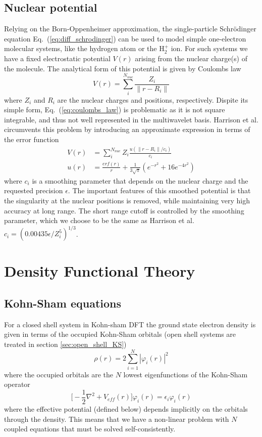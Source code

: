 \subsection{Nuclear potential}
Relying on the Born-Oppenheimer approximation, the single-particle 
Schr\"{o}dinger equation Eq.~(\ref{eq:diff_schrodinger}) can be used to model 
simple one-electron molecular systems, like the hydrogen atom or the H$_2^+$ 
ion. For such systems we have a fixed electrostatic potential $V(r)$ arising 
from the nuclear charge(s) of the molecule. The analytical form of this 
potential is given by Coulombs law
\begin{equation}
    \label{eq:coulombs_law}
    V(r) = \sum_i^{N_{nuc}} \frac{Z_i}{\| r-R_i \|}
\end{equation}
where $Z_i$ and $R_i$ are the nuclear charges and positions, respectively. 
Dispite its simple form, Eq.~(\ref{eq:coulombs_law}) is problematic as it is 
not square integrable, and thus not well represented in the multiwavelet basis. 
Harrison et al. \cite{Harrison} circumvents this problem by introducing an 
approximate expression in terms of the error function
\begin{align}
    \label{eq:harrison_potential}
    V(r) &= \sum_i^{N_{nuc}} Z_i \frac{u(\| r-R_i \|/c_i)}{c_i}\\
    u(r) &= \frac{erf(r)}{r} + \frac{1}{3\sqrt{\pi}}(e^{-r^2} + 16e^{-4r^2})
\end{align}
where $c_i$ is a smoothing parameter that depends on the nuclear charge and 
the requested precision $\epsilon$. The important features of this smoothed 
potential is that the singularity at the nuclear positions is removed, 
while maintaining very high accuracy at long range. The short range cutoff 
is controlled by the smoothing parameter, which we choose to be the same as 
Harrison et al.\cite{Harrison} $c_i = (0.00435 \epsilon/Z_i^5)^{1/3}$.

\section{Density Functional Theory} \label{sec:DFT}
\subsection{Kohn-Sham equations}
For a closed shell system in Kohn-sham DFT the ground state electron density is given 
in terms of the occupied Kohn-Sham orbitals (open shell systems are 
treated in section \ref{sec:open_shell_KS})
\begin{equation}
    \rho(r) = 2 \sum_{i=1}^N |\varphi_i(r)|^2
\end{equation}
where the occupied orbitals are the $N$ lowest eigenfunctions of the 
Kohn-Sham operator
\begin{equation}
    \label{eq:KS-diff}
    \big[-\frac{1}{2}\nabla^2 + V_{eff}(r)\big] \varphi_i(r) = \epsilon_i \varphi_i(r)
\end{equation}
where the effective potential (defined below) depends implicitly on the 
orbitals through the density. This means that we have a non-linear problem with $N$ coupled 
equations that must be solved self-consistently.

